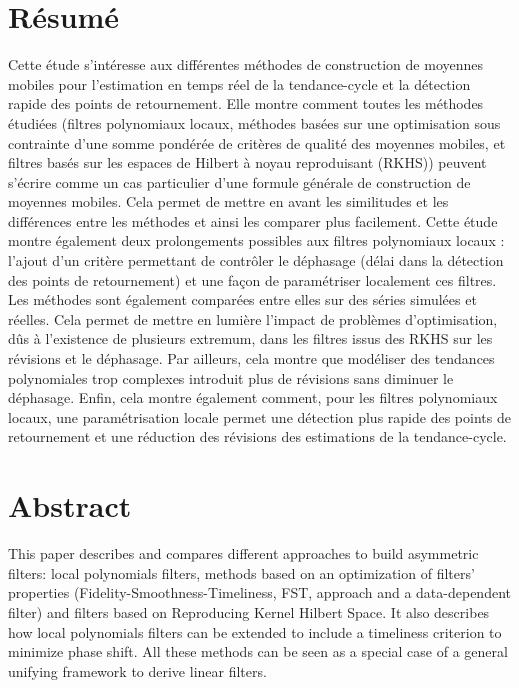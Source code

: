 \thispagestyle{fancy}

\hypertarget{ruxe9sumuxe9}{%
\section*{Résumé}\label{ruxe9sumuxe9}}

Cette étude s'intéresse aux différentes méthodes de construction de
moyennes mobiles pour l'estimation en temps réel de la tendance-cycle et
la détection rapide des points de retournement. Elle montre comment
toutes les méthodes étudiées (filtres polynomiaux locaux, méthodes
basées sur une optimisation sous contrainte d'une somme pondérée de
critères de qualité des moyennes mobiles, et filtres basés sur les
espaces de Hilbert à noyau reproduisant (RKHS)) peuvent s'écrire comme
un cas particulier d'une formule générale de construction de moyennes
mobiles. Cela permet de mettre en avant les similitudes et les
différences entre les méthodes et ainsi les comparer plus facilement.
Cette étude montre également deux prolongements possibles aux filtres
polynomiaux locaux : l'ajout d'un critère permettant de contrôler le
déphasage (délai dans la détection des points de retournement) et une
façon de paramétriser localement ces filtres. Les méthodes sont
également comparées entre elles sur des séries simulées et réelles. Cela
permet de mettre en lumière l'impact de problèmes d'optimisation, dûs à
l'existence de plusieurs extremum, dans les filtres issus des RKHS sur
les révisions et le déphasage. Par ailleurs, cela montre que modéliser
des tendances polynomiales trop complexes introduit plus de révisions
sans diminuer le déphasage. Enfin, cela montre également comment, pour
les filtres polynomiaux locaux, une paramétrisation locale permet une
détection plus rapide des points de retournement et une réduction des
révisions des estimations de la tendance-cycle.

\hypertarget{abstract}{%
\section*{Abstract}\label{abstract}}

This paper describes and compares different approaches to build
asymmetric filters: local polynomials filters, methods based on an
optimization of filters' properties (Fidelity-Smoothness-Timeliness,
FST, approach and a data-dependent filter) and filters based on
Reproducing Kernel Hilbert Space. It also describes how local
polynomials filters can be extended to include a timeliness criterion to
minimize phase shift. All these methods can be seen as a special case of
a general unifying framework to derive linear filters.

